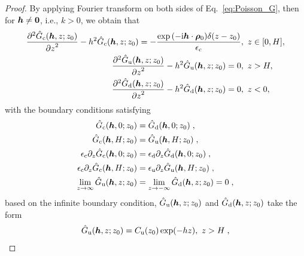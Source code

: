 \begin{proof}
    By applying Fourier transform on both sides of Eq.~\eqref{eq:Poisson_G}, then for $\boldsymbol{h}\neq \bm{0}$, i.e., $k>0$, we obtain that
    \begin{equation*} 
        \begin{split}
            \frac{\partial^2 \Hat{G}_{\mathrm{c}}(\boldsymbol{h}, z; z_0)}{{\partial z}^2} - h^2 \Hat{G}_{\mathrm{c}}(\boldsymbol{h}, z; z_0) = - \frac{ \exp{(-\mathrm{i} \boldsymbol{h} \cdot \boldsymbol{\rho}_0)}\delta (z- z_0)}{\epsilon_{\mathrm{c}}}&,~z \in [0, H],\\
            \frac{\partial^2 \hat{G}_{\mathrm{u}}(\boldsymbol{h}, z; z_0)}{{\partial z}^2} - h^2 \hat{G}_{\mathrm{u}}(\boldsymbol{h}, z; z_0) = 0&,~z > H,\\
            \frac{\partial^2 \hat{G}_{\mathrm{d}}(\boldsymbol{h}, z; z_0)}{{\partial z}^2} - h^2 \hat{G}_{\mathrm{d}}(\boldsymbol{h}, z; z_0) = 0&,~z < 0,
        \end{split}
    \end{equation*}
    with the boundary conditions satisfying
    \begin{equation*}
        \begin{split}
            \Hat{G}_{\mathrm{c}}(\boldsymbol{h}, 0; z_0) &= \Hat{G}_{\mathrm{d}}(\boldsymbol{h}, 0; z_0)\;,\\
            \hat{G}_{\mathrm{c}}(\boldsymbol{h}, H; z_0) &= \hat{G}_{\mathrm{u}}(\boldsymbol{h}, H; z_0)\;,\\
            \epsilon_{\mathrm{c}} \partial_z\Hat{G}_{\mathrm{c}}(\boldsymbol{h}, 0; z_0) &= \epsilon_{\mathrm{d}} \partial_z\Hat{G}_{\mathrm{d}}(\boldsymbol{h}, 0; z_0)\;,\\
            \epsilon_{\mathrm{c}} \partial_z\Hat{G}_{\mathrm{c}}(\boldsymbol{h}, H; z_0) &= \epsilon_{\mathrm{u}} \partial_z\Hat{G}_{\mathrm{u}}(\boldsymbol{h}, H; z_0)\;,\\
            \lim_{z \to \infty} \Hat{G}_{\mathrm{u}}(\boldsymbol{h}, z; z_0) &= \lim_{z \to -\infty}\Hat{G}_{\mathrm{d}}(\boldsymbol{h}, z; z_0)  = 0\;,
        \end{split}
    \end{equation*}
based on the infinite boundary condition,  $\Hat{G}_{\mathrm{u}}(\boldsymbol{h}, z; z_0)$ and $\Hat{G}_{\mathrm{d}}(\boldsymbol{h}, z; z_0)$ take the form
\begin{align*}
    \Hat{G}_{\mrm{u}}(\V{h}, z; z_0)&=C_{\mrm{u}}(z_0)\exp(- h z),~z > H\;,\\

\end{align*}
\end{proof}

